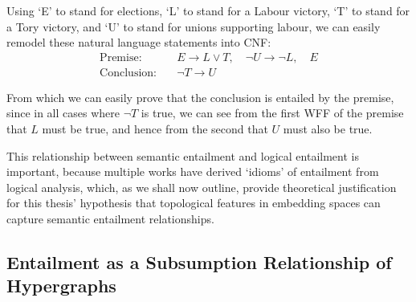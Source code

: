 \documentclass[12pt,twoside]{report}
\begin{document}
Using `E' to stand for elections, `L' to stand for a Labour victory, `T' to stand for a Tory victory, and `U' to stand for unions supporting labour, we can easily remodel these natural language statements into CNF: 
\begin{align*}
\text{Premise:} \quad & E \rightarrow L \lor T, \quad \lnot U \rightarrow \lnot L, \quad E \\
\text{Conclusion:} \quad & \lnot T \rightarrow U
\end{align*}

From which we can easily prove that the conclusion is entailed by the premise, since in all cases where $\lnot T$ is true, we can see from the first WFF of the premise that $L$ must be true, and hence from the second that $U$ must also be true. \newline \par

This relationship between semantic entailment and logical entailment is important, because multiple works have derived `idioms' of entailment from logical analysis, which, as we shall now outline, provide  theoretical justification for this thesis' hypothesis that topological features in embedding spaces can capture semantic entailment relationships. 

\subsection{Entailment as a Subsumption Relationship of Hypergraphs}
\end{document}
